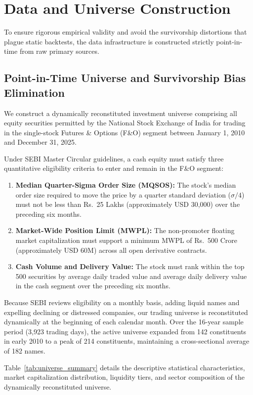 \documentclass[11pt,a4paper]{article}
\begin{document}
\section{Data and Universe Construction}
\label{sec:data}

To ensure rigorous empirical validity and avoid the survivorship distortions that plague static backtests, the data infrastructure is constructed strictly point-in-time from raw primary sources.

\subsection{Point-in-Time Universe and Survivorship Bias Elimination}
We construct a dynamically reconstituted investment universe comprising all equity securities permitted by the National Stock Exchange of India for trading in the single-stock Futures \& Options (F\&O) segment between January 1, 2010 and December 31, 2025. 

Under SEBI Master Circular guidelines, a cash equity must satisfy three quantitative eligibility criteria to enter and remain in the F\&O segment:
\begin{enumerate}
    \item \textbf{Median Quarter-Sigma Order Size (MQSOS):} The stock's median order size required to move the price by a quarter standard deviation ($\sigma/4$) must not be less than Rs.~25 Lakhs (approximately USD 30,000) over the preceding six months.
    \item \textbf{Market-Wide Position Limit (MWPL):} The non-promoter floating market capitalization must support a minimum MWPL of Rs.~500 Crore (approximately USD 60M) across all open derivative contracts.
    \item \textbf{Cash Volume and Delivery Value:} The stock must rank within the top 500 securities by average daily traded value and average daily delivery value in the cash segment over the preceding six months.
\end{enumerate}

Because SEBI reviews eligibility on a monthly basis, adding liquid names and expelling declining or distressed companies, our trading universe is reconstituted dynamically at the beginning of each calendar month. Over the 16-year sample period (3,923 trading days), the active universe expanded from 142 constituents in early 2010 to a peak of 214 constituents, maintaining a cross-sectional average of 182 names.

Table~\ref{tab:universe_summary} details the descriptive statistical characteristics, market capitalization distribution, liquidity tiers, and sector composition of the dynamically reconstituted universe.
\end{document}
